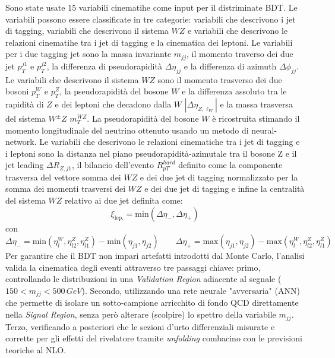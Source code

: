 \documentclass[11pt]{article}
\newcommand{\mjj}{\ensuremath{m_{jj}}}
\begin{document}
Sono state usate $15$ variabili cinematihe come input per il distriminate BDT. Le variabili possono essere classificate in tre categorie: variabili che descrivono i jet di tagging, variabili che descrivono il sistema $WZ$ e variabili che descrivono le relazioni cinematihe tra i jet di tagging e la cinematica dei leptoni. Le variabili per i due tagging jet sono la massa invariante $m_{jj}$, il momento traverso dei due jet $p_T^{j1}$ e $p_T^{j2}$, la differenza di pseudorapidità $\Delta \eta_{jj}$ e la differenza di azimuth $\Delta \phi_{jj}$. Le variabili che descrivono il sistema $WZ$ sono il momento trasverso dei due bosoni $p_T^W$ e $p_T^Z$, la pseudorapidità del bosone $W$ e la differenza assoluto tra le rapidità di $Z$ e dei leptoni che decadono dalla $W$ $|\Delta \eta_{Z,\ell_W}|$ e la massa trasversa del sistema $W^{\pm}Z$ $m_T^{WZ}$. La pseudorapidità del bosone $W$ è ricostruita stimando il momento longitudinale del neutrino ottenuto usando un metodo di neural-network. Le variabili che descrivono le relazioni cinematiche tra i jet di tagging e i leptoni sono la distanza nel piano pseudorapidità-azimutale tra il bosone Z e il jet leading $\Delta R_{Z,j1}$, il bilancio dell'evento $R_{pT}^{hard}$ definito come la componente trasversa del vettore somma dei $WZ$ e dei due jet di tagging normalizzato per la somma dei momenti trasversi dei $WZ$ e dei due jet di tagging e infine la centralità del sistema $WZ$ relativo ai due jet definita come: 
\begin{equation}
    \xi_\text{lep.}=\text{min}(\Delta\eta_-,\Delta\eta_+)
\end{equation}
con
\begin{equation}
    \Delta\eta_-=\text{min}(\eta_l^W, \eta_{l2}^Z,\eta_{l1}^Z)-\text{min}(\eta_{j1},\eta_{j2})\qquad \Delta\eta_+=\text{max}(\eta_{j1},\eta_{j2})-\text{max}(\eta_l^W, \eta_{l2}^Z,\eta_{l1}^Z)
\end{equation}
Per garantire che il BDT non impari artefatti introdotti dal Monte Carlo, l'analisi valida la cinematica degli eventi attraverso tre passaggi chiave: 
primo, controllando le distribuzioni in una \textit{Validation Region} adiacente al segnale ($150 < \mjj < 500\,\unit{GeV}$). 
Secondo, utilizzando una rete neurale "avversaria" (ANN) che permette di isolare un sotto-campione arricchito di fondo QCD direttamente nella \textit{Signal Region}, senza però alterare (scolpire) lo spettro della variabile \mjj. 
Terzo, verificando a posteriori che le sezioni d'urto differenziali misurate e corrette per gli effetti del rivelatore tramite \textit{unfolding} combacino con le previsioni teoriche al NLO.
\end{document}
